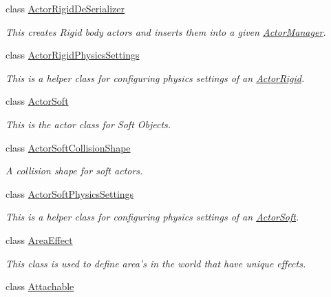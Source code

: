 \begin{DoxyCompactItemize}
class \hyperlink{classMezzanine_1_1ActorRigidDeSerializer}{ActorRigidDeSerializer}
\begin{DoxyCompactList}\small\item\em This creates Rigid body actors and inserts them into a given \hyperlink{classMezzanine_1_1ActorManager}{ActorManager}. \item\end{DoxyCompactList}\item 
class \hyperlink{classMezzanine_1_1ActorRigidPhysicsSettings}{ActorRigidPhysicsSettings}
\begin{DoxyCompactList}\small\item\em This is a helper class for configuring physics settings of an \hyperlink{classMezzanine_1_1ActorRigid}{ActorRigid}. \item\end{DoxyCompactList}\item 
class \hyperlink{classMezzanine_1_1ActorSoft}{ActorSoft}
\begin{DoxyCompactList}\small\item\em This is the actor class for Soft Objects. \item\end{DoxyCompactList}\item 
class \hyperlink{classMezzanine_1_1ActorSoftCollisionShape}{ActorSoftCollisionShape}
\begin{DoxyCompactList}\small\item\em A collision shape for soft actors. \item\end{DoxyCompactList}\item 
class \hyperlink{classMezzanine_1_1ActorSoftPhysicsSettings}{ActorSoftPhysicsSettings}
\begin{DoxyCompactList}\small\item\em This is a helper class for configuring physics settings of an \hyperlink{classMezzanine_1_1ActorSoft}{ActorSoft}. \item\end{DoxyCompactList}\item 
class \hyperlink{classMezzanine_1_1AreaEffect}{AreaEffect}
\begin{DoxyCompactList}\small\item\em This class is used to define area's in the world that have unique effects. \item\end{DoxyCompactList}\item 
class \hyperlink{classMezzanine_1_1Attachable}{Attachable}

\end{DoxyCompactItemize}
